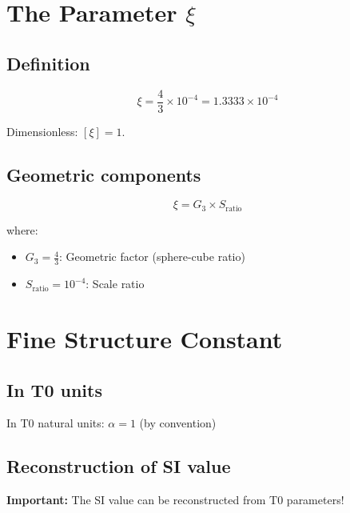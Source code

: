 	\section{The Parameter $\xi$}
	\label{sec:xi_parameter}
	
	\subsection{Definition}
	
	\begin{equation}
		\boxed{\xi = \frac{4}{3} \times 10^{-4} = 1.3333 \times 10^{-4}}
	\end{equation}
	
	Dimensionless: $[\xi] = 1$.
	
	\subsection{Geometric components}
	
	\begin{equation}
		\xi = G_3 \times S_{\text{ratio}}
	\end{equation}
	
	where:
	\begin{itemize}
		\item $G_3 = \frac{4}{3}$: Geometric factor (sphere-cube ratio)
		\item $S_{\text{ratio}} = 10^{-4}$: Scale ratio
	\end{itemize}
	
	\section{Fine Structure Constant}
	\label{sec:fine_structure}
	
	\subsection{In T0 units}
	
	In T0 natural units: $\alpha = 1$ (by convention)
	
	\subsection{Reconstruction of SI value}
	
	\textbf{Important:} The SI value can be reconstructed from T0 parameters!
	
